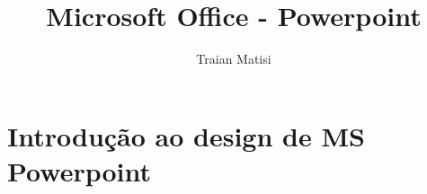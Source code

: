 \documentclass[12pt,a4paper]{article} %
\title{Microsoft Office - Powerpoint}
\author{Traian Matisi}
\begin{document}
	\maketitle
	\section{Introdução ao design de MS Powerpoint}
	
\end{document}
